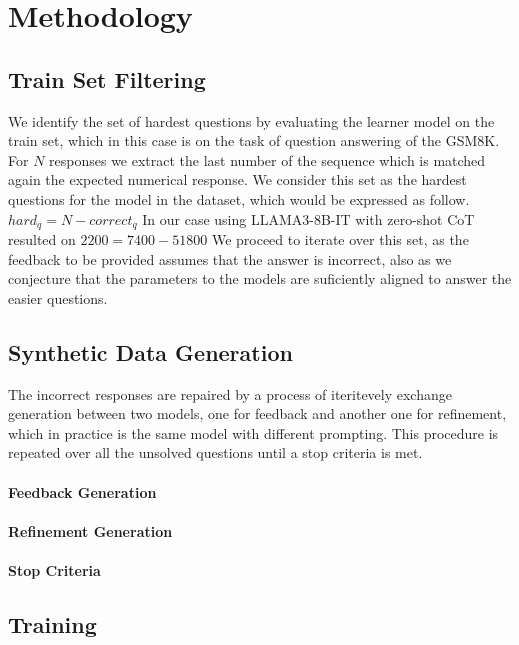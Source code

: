 \documentclass[a4paper,10pt]{article}
\title{}
\author{}
\begin{document}
\maketitle

\begin{abstract}

\end{abstract}

\section{Methodology}

\subsection{Train Set Filtering}
We identify the set of hardest questions by evaluating the learner model on the train set, which in this case is on the task of question answering of the GSM8K. For $N$ responses we extract the last number of the sequence which is matched again the expected numerical response. We consider this set as the hardest questions for the model in the dataset, which would be expressed as follow. $ hard_q =  N - correct_q $
In our case using LLAMA3-8B-IT with zero-shot CoT resulted on $ 2200 = 7400 - 51800 $ We proceed to iterate over this set, as the feedback to be provided assumes that the answer is incorrect, also as we conjecture that the parameters to the models are suficiently aligned to answer the easier questions.
\subsection{Synthetic Data Generation}
The incorrect responses are repaired by a process of iteritevely exchange generation between two models, one for feedback and another one for refinement, which in practice is the same model with different prompting. This procedure is repeated over all the unsolved questions until a stop criteria is met.
\paragraph{Feedback Generation}
\paragraph{Refinement Generation}
\paragraph{Stop Criteria}

\subsection{Training}
\end{document}
